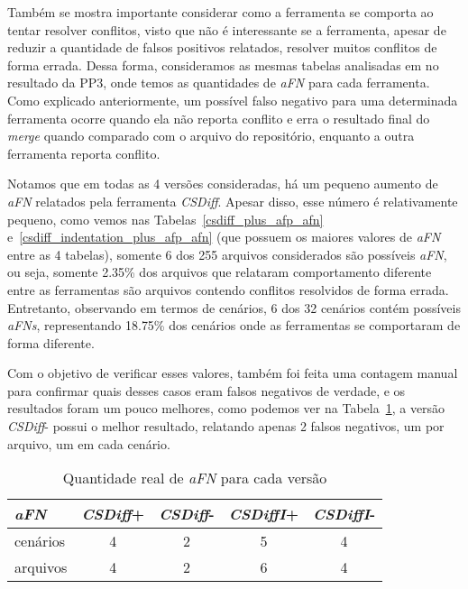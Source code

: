 Também se mostra importante considerar como a ferramenta se comporta ao tentar
resolver conflitos, visto que não é interessante se a ferramenta, apesar de
reduzir a quantidade de falsos positivos relatados, resolver muitos conflitos
de forma errada. Dessa forma, consideramos as mesmas tabelas analisadas em no
resultado da PP3, onde temos as quantidades de \emph{aFN} para cada ferramenta.
Como explicado anteriormente, um possível falso negativo para uma determinada
ferramenta ocorre quando ela não reporta conflito e erra o resultado final do
\emph{merge} quando comparado com o arquivo do repositório, enquanto a outra
ferramenta reporta conflito.

Notamos que em todas as 4 versões consideradas, há um pequeno aumento de
\emph{aFN} relatados pela ferramenta \emph{CSDiff}. Apesar disso, esse número é
relativamente pequeno, como vemos nas Tabelas~\ref{csdiff_plus_afp_afn}
e~\ref{csdiff_indentation_plus_afp_afn} (que possuem os maiores valores de
\emph{aFN} entre as 4 tabelas), somente 6 dos 255 arquivos considerados são
possíveis \emph{aFN}, ou seja, somente 2.35\% dos arquivos que relataram
comportamento diferente entre as ferramentas são arquivos contendo conflitos
resolvidos de forma errada. Entretanto, observando em termos de cenários, 6 dos
32 cenários contém possíveis \emph{aFNs}, representando 18.75\% dos cenários
onde as ferramentas se comportaram de forma diferente.

Com o objetivo de verificar esses valores, também foi feita uma contagem manual
para confirmar quais desses casos eram falsos negativos de verdade, e os
resultados foram um pouco melhores, como podemos ver na
Tabela~\ref{tabela_afn_final}, a versão \emph{CSDiff}- possui o melhor
resultado, relatando apenas 2 falsos negativos, um por arquivo, um em cada
cenário.

\begin{table}[ht]
	\begin{center}
		\begin{tabular}{|l|c|c|c|c|}
			\hline
			\textbf{\emph{aFN}} & \textbf{\emph{CSDiff}+} & \textbf{\emph{CSDiff}-} & \textbf{\emph{CSDiffI}+} & \textbf{\emph{CSDiffI}-} \\
			\hline
			cenários            & 4                       & 2                       & 5                        & 4                        \\
			arquivos            & 4                       & 2                       & 6                        & 4                        \\
			\hline
		\end{tabular}
	\end{center}
	\caption{Quantidade real de \emph{aFN} para cada versão}\label{tabela_afn_final}
\end{table}

